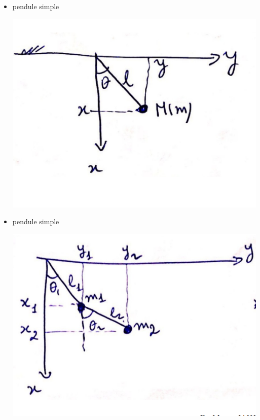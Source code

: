\documentclass[12pt]{book}
\begin{document}
            \begin{itemize}
                \item pendule simple \\
                \begin{minipage}{0.49\linewidth}
                    \includegraphics[width = \linewidth]{pic/pendulesimple.png}
                \end{minipage}
                \begin{minipage}{0.39\linewidth}
                \end{minipage}
                \item pendule simple \\
                \begin{minipage}{0.49\linewidth}
                    \includegraphics[width = \linewidth]{pic/penduledouble.png}
                \end{minipage}
                \begin{minipage}{0.39\linewidth}
                     \\
                \end{minipage}
            \end{itemize}
\end{document}
